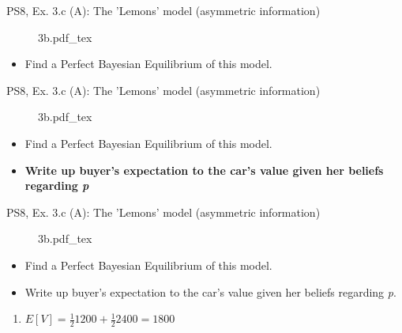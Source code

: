 \begin{frame}{PS8, Ex. 3.c (A): The 'Lemons' model (asymmetric information)}
    \begin{figure}[!h]
      \center
      \def\svgwidth{.8\columnwidth}
      {3b.pdf_tex}
    \end{figure}
    \vspace{-8pt}
    \begin{itemize}
      \item[(c)] Find a Perfect Bayesian Equilibrium of this model.
    \end{itemize}
    \vfill\null
\end{frame}
\begin{frame}{PS8, Ex. 3.c (A): The 'Lemons' model (asymmetric information)}
    \begin{figure}[!h]
      \center
      \def\svgwidth{.8\columnwidth}
      {3b.pdf_tex}
    \end{figure}
    \vspace{-8pt}
    \begin{itemize}
      \item[(c)] Find a Perfect Bayesian Equilibrium of this model.
    \end{itemize}
    \vspace{-12pt}
    \begin{multicols}{2}
      \begin{itemize}
        \item[Step 1:] \textbf{Write up buyer's expectation to the car's value given her beliefs regarding \textit{p}}
      \end{itemize}
      \vfill\null\columnbreak
      \vfill\null
    \end{multicols}
\end{frame}
\begin{frame}{PS8, Ex. 3.c (A): The 'Lemons' model (asymmetric information)}
    \begin{figure}[!h]
      \center
      \def\svgwidth{.8\columnwidth}
      {3b.pdf_tex}
    \end{figure}
    \vspace{-8pt}
    \begin{itemize}
      \item[(c)] Find a Perfect Bayesian Equilibrium of this model.
    \end{itemize}
    \vspace{-12pt}
    \begin{multicols}{2}
      \begin{itemize}
        \item[Step 1:] Write up buyer's expectation to the car's value given her beliefs regarding \textit{p}.
      \end{itemize}
      \vfill\null\columnbreak
      \begin{enumerate}
        \item $E[V]=\frac{1}{2}1200+\frac{1}{2}2400=1800$
      \end{enumerate}
      \vfill\null
    \end{multicols}
\end{frame}
